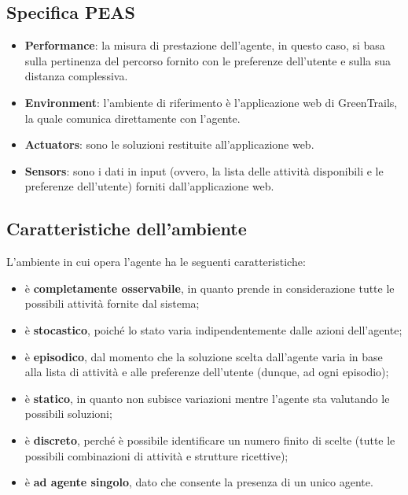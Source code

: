 \documentclass{CSUniSchoolLabReport}
\begin{document}
\pagebreak

\subsection{Specifica PEAS}

\begin{itemize}
 \item \textbf{Performance}: la misura di prestazione dell'agente, in questo caso, si basa sulla pertinenza del percorso fornito con le preferenze dell'utente e sulla sua distanza complessiva.
 \item \textbf{Environment}: l'ambiente di riferimento è l'applicazione web di GreenTrails, la quale comunica direttamente con l'agente.
 \item \textbf{Actuators}: sono le soluzioni restituite all'applicazione web.
 \item \textbf{Sensors}: sono i dati in input (ovvero, la lista delle attività disponibili e le preferenze dell'utente) forniti dall'applicazione web.
\end{itemize}


\subsection{Caratteristiche dell'ambiente}

L'ambiente in cui opera l'agente ha le seguenti caratteristiche:
\begin{itemize}
 \item è \textbf{completamente osservabile}, in quanto prende in considerazione tutte le possibili attività fornite dal sistema;
 \item è \textbf{stocastico}, poiché lo stato varia indipendentemente dalle azioni dell'agente;
 \item è \textbf{episodico}, dal momento che la soluzione scelta dall'agente varia in base alla lista di attività e alle preferenze dell'utente (dunque, ad ogni episodio);
 \item è \textbf{statico}, in quanto non subisce variazioni mentre l'agente sta valutando le possibili soluzioni;
 \item è \textbf{discreto}, perché è possibile identificare un numero finito di scelte (tutte le possibili combinazioni di attività e strutture ricettive);
 \item è \textbf{ad agente singolo}, dato che consente la presenza di un unico agente.
\end{itemize}
\end{document}
